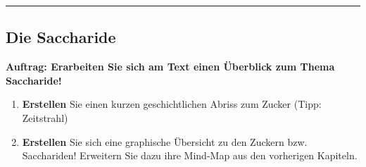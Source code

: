 \documentclass{scrartcl}  %
\begin{document}
		\begin{center}
			\noindent\rule{18cm}{0.1pt}
		\end{center}
	
\newpage		
		\subsection{Die Saccharide}
		
			\textbf{Auftrag: Erarbeiten Sie sich am Text einen Überblick zum Thema Saccharide!}
			\begin{enumerate}
				\item \textbf{Erstellen} Sie einen kurzen geschichtlichen Abriss zum Zucker (Tipp: Zeitstrahl)
				\item \textbf{Erstellen} Sie sich eine graphische Übersicht zu den Zuckern bzw. Sacchariden! Erweitern Sie dazu ihre Mind-Map aus den vorherigen Kapiteln.
			\end{enumerate}
			
\end{document}
